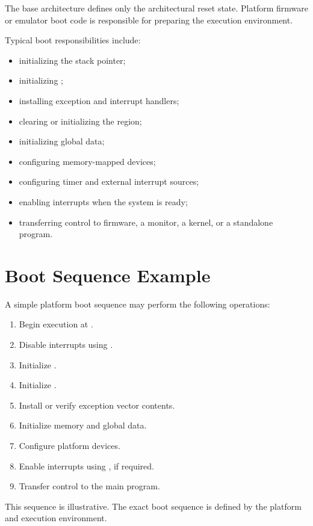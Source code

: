 The base architecture defines only the architectural reset state. Platform firmware or emulator boot code is responsible for preparing the execution environment.

Typical boot responsibilities include:

\begin{itemize}
\item initializing the stack pointer;
\item initializing ;
\item installing exception and interrupt handlers;
\item clearing or initializing the  region;
\item initializing global data;
\item configuring memory-mapped devices;
\item configuring timer and external interrupt sources;
\item enabling interrupts when the system is ready;
\item transferring control to firmware, a monitor, a kernel, or a standalone program.
\end{itemize}

\section{Boot Sequence Example}

A simple platform boot sequence may perform the following operations:

\begin{enumerate}
\item Begin execution at .
\item Disable interrupts using .
\item Initialize .
\item Initialize .
\item Install or verify exception vector contents.
\item Initialize memory and global data.
\item Configure platform devices.
\item Enable interrupts using , if required.
\item Transfer control to the main program.
\end{enumerate}

\noindent
This sequence is illustrative. The exact boot sequence is defined by the platform and execution environment.
